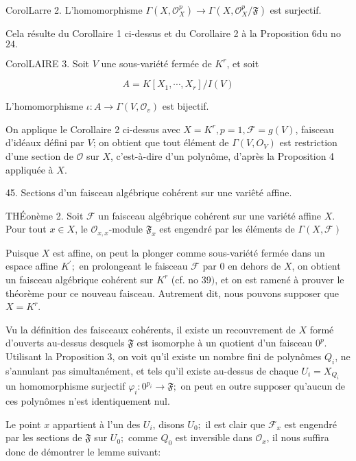 CorolLarre 2. L'homomorphisme $\Gamma\left(X, \mathcal{O}_{X}^{p}\right) \rightarrow \Gamma\left(X, \mathcal{O}_{X}^{p} / \mathfrak{F}\right)$ est surjectif.

Cela résulte du Corollaire 1 ci-dessus et du Corollaire 2 à la Proposition $6 \mathrm{du}$ no $24 .$

CorolLAIRE $3 .$ Soit $V$ une sous-variété fermée de $K^{r}$, et soit

$$
A=K\left[X_{1}, \cdots, X_{r}\right] / I(V)
$$

L'homomorphisme $\iota: A \rightarrow \Gamma\left(V, \mathcal{O}_{v}\right)$ est bijectif.

On applique le Corollaire 2 ci-dessus avec $X=K^{r}, p=1, \mathscr{F}=g(V)$, faisceau d'idéaux défini par $V$; on obtient que tout élément de $\Gamma\left(V, O_{V}\right)$ est restriction d'une section de $\mathcal{O}$ sur $X$, c'est-à-dire d'un polynôme, d'après la Proposition 4 appliquée à $X$.

45. Sections d'un faisceau algébrique cohérent sur une variêté affine.

THÉonème 2. Soit $\mathcal{F}$ un faisceau algébrique cohérent sur une variété affine $X$. Pour tout $x \in X$, le $\mathcal{O}_{x, x}$-module $\mathfrak{F}_{x}$ est engendré par les éléments de $\Gamma(X, \mathcal{F})$

Puisque $X$ est affine, on peut la plonger comme sous-variété fermée dans un espace affine $K^{\prime} ;$ en prolongeant le faisceau $\mathcal{F}$ par 0 en dehors de $X$, on obtient un faisceau algébrique cohérent sur $K^{r}$ (cf. no 39$)$, et on est ramené à prouver le théorème pour ce nouveau faisceau. Autrement dit, nous pouvons supposer que $X=K^{r}$.

Vu la définition des faisceaux cohérents, il existe un recouvrement de $X$ formé d'ouverts au-dessus desquels $\mathfrak{F}$ est isomorphe à un quotient d'un faisceau $0^{p}$. Utilisant la Proposition 3, on voit qu'il existe un nombre fini de polynômes $Q_{i}$, ne s'annulant pas simultanément, et tels qu'il existe au-dessus de chaque $U_{i}=X_{Q_{i}}$ un homomorphisme surjectif $\varphi_{i}: 0^{p_{i}} \rightarrow \mathfrak{F} ;$ on peut en outre supposer qu'aucun de ces polynômes n'est identiquement nul.

Le point $x$ appartient à l'un des $U_{i}$, disons $U_{0} ;$ il est clair que $\mathscr{F}_{x}$ est engendré par les sections de $\mathfrak{F}$ sur $U_{0} ;$ comme $Q_{0}$ est inversible dans $\mathcal{O}_{x}$, il nous suffira donc de démontrer le lemme suivant:

